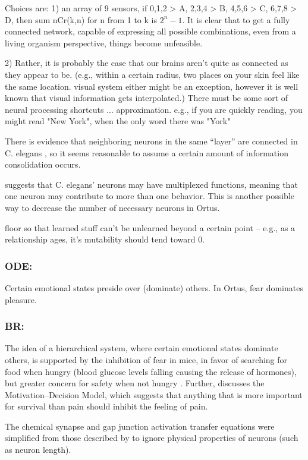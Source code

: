 \documentclass[letterpaper]{article}
\begin{document}
Choices are:
1) an array of 9 sensors, if 0,1,2 > A, 2,3,4 > B, 4,5,6 > C, 6,7,8 > D, then sum {nCr(k,n)} for n from 1 to k is $2^n - 1$. It is clear that to get a fully connected network, capable of expressing all possible combinations, even from a living organism perspective, things become unfeasible.

2) Rather, it is probably the case that our brains aren't quite as connected as they appear to be. (e.g., within a certain radius, two places on your skin feel like the same location. visual system either might be an exception, however it is well known that visual information gets interpolated.)
There must be some sort of neural processing shortcuts ... approximation. e.g., if you are quickly reading, you might read "New York", when the only word there was "York"

There is evidence that neighboring neurons in the same ``layer'' are connected in C. elegans \citep{Azulay2016}, so it seems reasonable to assume a certain amount of information consolidation occurs.


\citet{Schroter2017} suggests that C. elegans' neurons may have multiplexed functions, meaning that one neuron may contribute to more than one behavior. This is another possible way to decrease the number of necessary neurons in Ortus.


floor so that learned stuff can't be unlearned beyond a certain point -- e.g., as a relationship ages, it's mutability should tend toward 0.

\subsubsection{ODE:} Certain emotional states preside over (dominate) others. In Ortus, fear dominates pleasure.

\subsubsection{BR:} The idea of a hierarchical system, where certain emotional states dominate others, is supported by the inhibition of fear in mice, in favor of searching for food when hungry (blood glucose levels falling causing the release of hormones), but greater concern for safety when not hungry \citep{Verma2015}. Further, \citet{Leknes2008} discusses the Motivation--Decision Model, which suggests that anything that is more important for survival than pain should inhibit the feeling of pain.

The chemical synapse and gap junction activation transfer equations were simplified from those described by \cite{Wicks1996} to ignore physical properties of neurons (such as neuron length).
\end{document}
